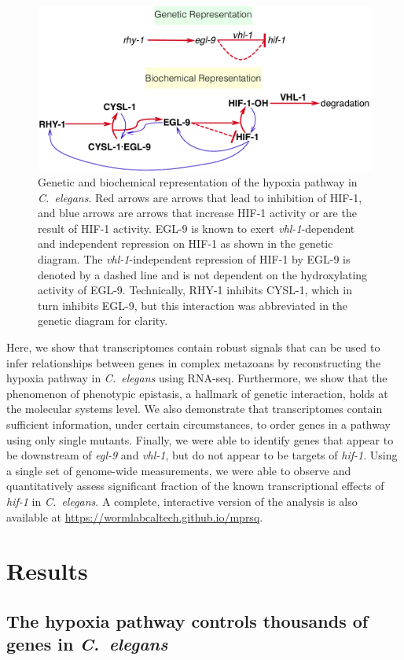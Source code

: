 \documentclass[10pt, onecolumn]{article}
\newcommand{\cel}{\emph{C.~elegans}}
\newcommand{\gene}[1]{\emph{#1}}
\newcommand{\eglp}{EGL-9}
\newcommand{\hifp}{HIF-1}
\begin{document}
\begin{figure}[tbhp]
\centering
\includegraphics[width=.7\linewidth]{../figs/HIF1pathway.pdf}
\caption{
Genetic and biochemical representation of the hypoxia pathway in \cel{}.
Red arrows are arrows that lead to inhibition of \hifp{}, and blue arrows
are arrows that increase \hifp{} activity or are the result of \hifp{} activity.
\eglp{} is known to exert \gene{vhl-1}-dependent and independent repression
on \hifp{} as shown in the genetic diagram. The \gene{vhl-1}-independent
repression of \hifp{} by \eglp{} is denoted by a dashed line and is not dependent
on the hydroxylating activity of \eglp{}.
Technically, RHY-1 inhibits CYSL-1, which in turn inhibits EGL-9, but this
interaction was abbreviated in the genetic diagram for clarity.
}
\label{fig:pathway}
\end{figure}

Here, we show that transcriptomes contain robust signals that can be
used to infer relationships between genes in complex metazoans by reconstructing
the hypoxia pathway in \cel{} using RNA-seq.
Furthermore, we show that the phenomenon of phenotypic epistasis, a hallmark of
genetic interaction, holds at the molecular systems level.
We also demonstrate that transcriptomes contain sufficient information, under
certain circumstances, to order genes in a pathway using only single mutants.
Finally, we were able to identify genes that appear to be downstream of \gene{egl-9}
and \gene{vhl-1}, but do not appear to be targets of \gene{hif-1}.
Using a single set of genome-wide measurements, we were able to observe and
quantitatively assess  significant fraction of the known transcriptional
effects of \gene{hif-1} in \cel{}.
A complete, interactive version of the analysis is also available at
\url{https://wormlabcaltech.github.io/mprsq}.

\section*{Results}
\subsection*{The hypoxia pathway controls thousands of genes in \cel{}}
\label{sub:summary}
\end{document}
